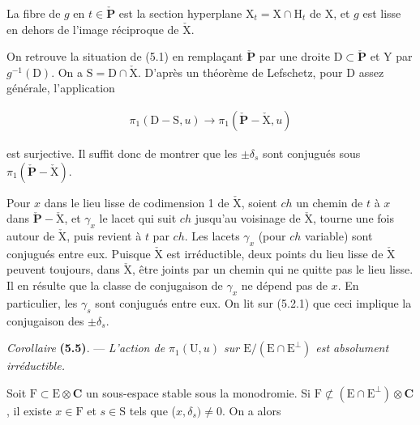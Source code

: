 \documentclass[10pt,leqno]{article}
\begin{document}
\noindent La fibre de \(g\) en \(t\in \check{\mathbf{P}}\) est la section hyperplane \(\mathrm{X}_{t}=\mathrm{X}\cap \mathrm{H}_{t}\) de \(\mathrm{X}\), et \(g\) est lisse en dehors de l’image réciproque de \(\check{\mathrm{X}}\).\par

\noindent On retrouve la situation de (5.1) en remplaçant \(\check{\mathbf{P}}\) par une droite \(\mathrm{D}\subset \check{\mathbf{P}}\) et \(\mathrm{Y}\) par \(g^{- 1}(\mathrm{D})\). On a \(\mathrm{S}=\mathrm{D}\cap \check{\mathrm{X}}\). D’après un théorème de Lefschetz, pour \(\mathrm{D}\) assez générale, l’application\par

\begin{equation*}\begin{gathered}\pi _{1}(\mathrm{D}- \mathrm{S},u) \longrightarrow  \pi _{1}(\check{\mathbf{P}}- \check{\mathrm{X}},u)\end{gathered}\end{equation*}

\noindent est surjective. Il suffit donc de montrer que les \(\pm \delta _{s}\) sont conjugués sous \(\pi _{1}(\check{\mathbf{P}}- \check{\mathrm{X}})\).\par

\noindent Pour \(x\) dans le lieu lisse de codimension 1 de \(\check{\mathrm{X}}\), soient \(ch\) un chemin de \(t\) à \(x\) dans \(\check{\mathbf{P}}- \check{\mathrm{X}}\), et \(\gamma _{x}\) le lacet qui suit \(ch\) jusqu’au voisinage de \(\check{\mathrm{X}}\), tourne une fois autour de \(\check{\mathrm{X}}\), puis revient à \(t\) par \(ch\). Les lacets \(\gamma _{x}\) (pour \(ch\) variable) sont conjugués entre eux. Puisque \(\check{\mathrm{X}}\) est irréductible, deux points du lieu lisse de \(\check{\mathrm{X}}\) peuvent toujours, dans \(\check{\mathrm{X}}\), être joints par un chemin qui ne quitte pas le lieu lisse. Il en résulte que la classe de conjugaison de \(\gamma _{x}\) ne dépend pas de \(x\). En particulier, les \(\gamma _{s}\) sont conjugués entre eux. On lit sur (5.2.1) que ceci implique la conjugaison des \(\pm \delta _{s}\).\par

\noindent \emph{Corollaire} \textbf{(5.5)}. — {\itshape L’action de \(\pi _{1}(\mathrm{U},u)\) sur \(\mathrm{E}/(\mathrm{E}\cap \mathrm{E}^{\perp })\) est absolument irréductible.}\par

\noindent Soit \(\mathrm{F}\subset \mathrm{E}\otimes \mathbf{C}\) un sous-espace stable sous la monodromie. Si \(\mathrm{F}\not\subset (\mathrm{E}\cap \mathrm{E}^{\perp })\otimes \mathbf{C}\), il existe \(x\in \mathrm{F}\) et \(s\in \mathrm{S}\) tels que (\(x,\delta _{s})\ne 0\). On a alors\par
\end{document}
